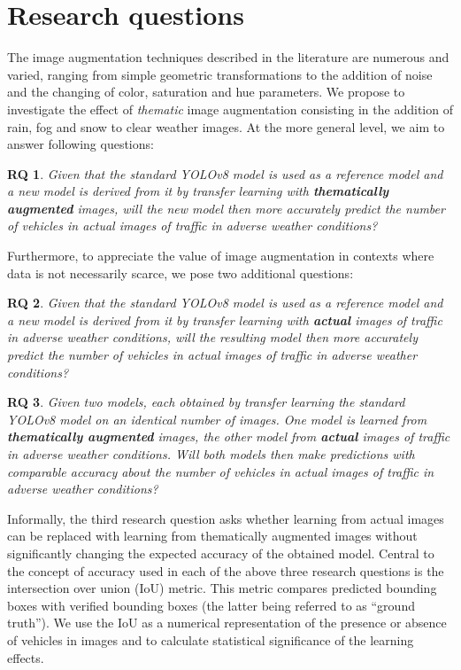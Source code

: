 \documentclass[]{article}
\newtheorem{researchquestion}{RQ}
\begin{document}
\section{Research questions}

	The image augmentation techniques described in the literature are numerous and varied, ranging from simple geometric transformations to the addition of noise and the changing of color, saturation and hue parameters. We propose to investigate the effect of \textit{thematic} image augmentation consisting in the addition of rain, fog and snow to clear weather images. At the more general level, we aim to answer following questions:

	\begin{researchquestion}
		\label{rq1}
		Given that the standard YOLO{\small v8} model is used as a reference model and a new model is derived from it by transfer learning with \textbf{\textit{thematically augmented}} images, will the new model then more accurately predict the number of vehicles in actual images of traffic in adverse weather conditions?
	\end{researchquestion}

	Furthermore, to appreciate the value of image augmentation in contexts where data is not necessarily scarce, we pose two additional questions:
	\begin{researchquestion}
		\label{rq2}
		Given that the standard YOLO{\small v8} model is used as a reference model and a new model is derived from it by transfer learning with \textbf{\textit{actual}} images of traffic in adverse weather conditions, will the resulting model then more accurately predict the number of vehicles in actual images of traffic in adverse weather conditions?
	\end{researchquestion}

	\begin{researchquestion}
		\label{rq3}
		Given two models, each obtained by transfer learning the standard YOLO{\small v8} model on an identical number of images. One model is learned from \textbf{\textit{thematically augmented}} images, the other model from \textbf{\textit{actual}} images of traffic in adverse weather conditions. Will both models then make predictions with comparable accuracy about the number of vehicles in actual images of traffic in adverse weather conditions?
	\end{researchquestion}

	Informally, the third research question asks whether learning from actual images can be replaced with learning from thematically augmented images without significantly changing the expected accuracy of the obtained model. Central to the concept of accuracy used in each of the above three research questions is the intersection over union (IoU) metric. This metric compares predicted bounding boxes with verified bounding boxes (the latter being referred to as ``ground truth''). We use the IoU as a numerical representation of the presence or absence of vehicles in images and to calculate statistical significance of the learning effects. 
\end{document}
